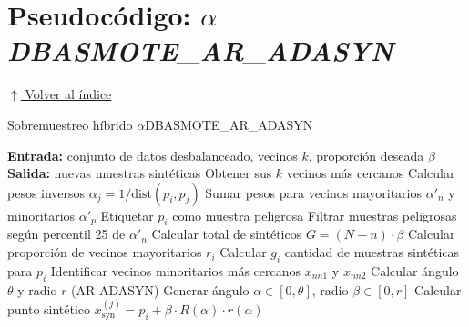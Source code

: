 \section*{Pseudocódigo: \textit{\boldmath$\alpha$DBASMOTE\_AR\_ADASYN}}
\noindent\hypertarget{pseudocodigo_alfa_dbasmote_ar_adasyn}{}\hyperlink{toc}{\small$\uparrow$ Volver al índice}

\begin{algorithm}[H]
\caption{Sobremuestreo híbrido \boldmath$\alpha$DBASMOTE\_AR\_ADASYN}
\begin{algorithmic}[1]
\State \textbf{Entrada:} conjunto de datos desbalanceado, vecinos $k$, proporción deseada $\beta$
\State \textbf{Salida:} nuevas muestras sintéticas
  \State Obtener sus $k$ vecinos más cercanos
  \State Calcular pesos inversos $\alpha_j = 1/\text{dist}(p_i, p_j)$
  \State Sumar pesos para vecinos mayoritarios $\alpha'_n$ y minoritarios $\alpha'_p$
    \State Etiquetar $p_i$ como muestra peligrosa
  \EndIf
\EndFor
\State Filtrar muestras peligrosas según percentil 25 de $\alpha'_n$
\State Calcular total de sintéticos $G = (N - n) \cdot \beta$
  \State Calcular proporción de vecinos mayoritarios $r_i$
  \State Calcular $g_i$ cantidad de muestras sintéticas para $p_i$
  \State Identificar vecinos minoritarios más cercanos $x_{nn1}$ y $x_{nn2}$
  \State Calcular ángulo $\theta$ y radio $r$ (AR-ADASYN)
    \State Generar ángulo $\alpha \in [0, \theta]$, radio $\beta \in [0, r]$
    \State Calcular punto sintético $x^{(j)}_{\text{syn}} = p_i + \beta \cdot R(\alpha) \cdot r(\alpha)$
  \EndFor
\EndFor
\end{algorithmic}
\end{algorithm}
